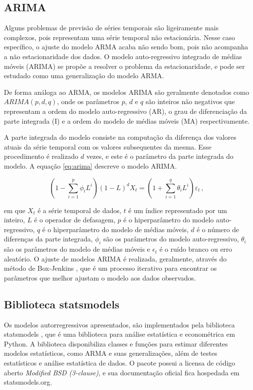\subsection{ARIMA}
Alguns problemas de previsão de séries temporais são ligeiramente mais complexos, pois representam uma série temporal não estacionária. Nesse caso específico, o ajuste do modelo ARMA acaba não sendo bom, pois não acompanha a não estacionaridade dos dados. O modelo auto-regressivo integrado de médias móveis (ARIMA) se propõe a resolver o problema da estacionaridade, e pode ser estudado como uma generalização do modelo ARMA.

De forma análoga ao ARMA, os modelos ARIMA são geralmente denotados como $ARIMA(p, d, q)$, onde os parâmetros $p$, $d$ e $q$ são inteiros não negativos que representam a ordem do modelo auto-regressivo (AR), o grau de diferenciação da parte integrada (I) e a ordem do modelo de médias móveis (MA) respectivamente.

A parte integrada do modelo consiste na computação da diferença dos valores atuais da série temporal com os valores subsequentes da mesma. Esse procedimento é realizado $d$ vezes, e este é o parâmetro da parte integrada do modelo. A equação \eqref{eq:arima} descreve o modelo ARIMA.

\begin{equation}\label{eq:arima}
    \left(1-\sum_{i=1}^{p} \phi_{i} L^{i}\right)(1-L)^{d} X_{t}=\left(1+\sum_{i=1}^{q} \theta_{i} L^{i}\right) \varepsilon_{t}\, ,
\end{equation}

em que $X_{t}$ é a série temporal de dados, $t$ é um índice representado por um inteiro, $L$ é o operador de defasagem, $p$ é o hiperparâmetro do modelo auto-regressivo, $q$ é o hiperparâmetro do modelo de médias móveis, $d$ é o número de diferenças da parte integrada, $\phi_{i}$ são os parâmetros do modelo auto-regressivo, $\theta_{i}$ são os parâmetros do modelo de médias móveis e $\epsilon_{t}$ é o ruído branco ou erro aleatório. O ajuste de modelos ARIMA é realizada, geralmente, através do método de Box-Jenkins \cite{box&jenkins}, que é um processo iterativo para encontrar os parâmetros que melhor ajustam o modelo aos dados observados.

\subsection{Biblioteca statsmodels}
Os modelos autorregressivos apresentados, são implementados pela biblioteca statsmodels \cite{seabold2010statsmodels}, que é uma biblioteca para análise estatística e econométrica em Python. A biblioteca disponibiliza classes e funções para estimar diferentes modelos estatísticos, como ARMA e suas generalizações, além de testes estatísticos e análise estatística de dados. O pacote possui a licensa de código aberto \textit{Modified BSD (3-clause)}, e sua documentação oficial fica hospedada em statsmodels.org.


